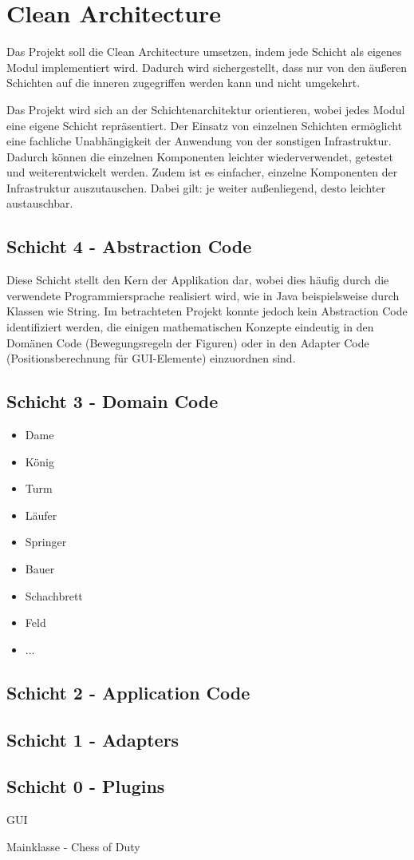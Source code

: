 \chapter{Clean Architecture}

Das Projekt soll die Clean Architecture umsetzen, indem jede Schicht als eigenes Modul implementiert wird. 
Dadurch wird sichergestellt, dass nur von den äußeren Schichten auf die inneren zugegriffen werden kann und nicht umgekehrt. 

Das Projekt wird sich an der Schichtenarchitektur orientieren, wobei jedes Modul eine eigene Schicht repräsentiert. 
Der Einsatz von einzelnen Schichten ermöglicht eine fachliche Unabhängigkeit der Anwendung von der sonstigen Infrastruktur. 
Dadurch können die einzelnen Komponenten leichter wiederverwendet, getestet und weiterentwickelt werden. 
Zudem ist es einfacher, einzelne Komponenten der Infrastruktur auszutauschen. 
Dabei gilt: je weiter außenliegend, desto leichter austauschbar.

\section*{Schicht 4 - Abstraction Code}

Diese Schicht stellt den Kern der Applikation dar, wobei dies häufig durch die verwendete Programmiersprache realisiert wird, wie in Java beispielsweise durch Klassen wie String.
Im betrachteten Projekt konnte jedoch kein Abstraction Code identifiziert werden, die einigen mathematischen Konzepte eindeutig in den Domänen Code (Bewegungsregeln der Figuren) oder in den Adapter Code (Positionsberechnung für GUI-Elemente) einzuordnen sind. 

\section*{Schicht 3 - Domain Code}

\begin{itemize}
    \item Dame
    \item König
    \item Turm
    \item Läufer
    \item Springer
    \item Bauer
    \item Schachbrett
    \item Feld
    \item ...
\end{itemize}

\section*{Schicht 2 - Application Code}

\section*{Schicht 1 - Adapters}

\section*{Schicht 0 - Plugins}

GUI


Mainklasse - Chess of Duty